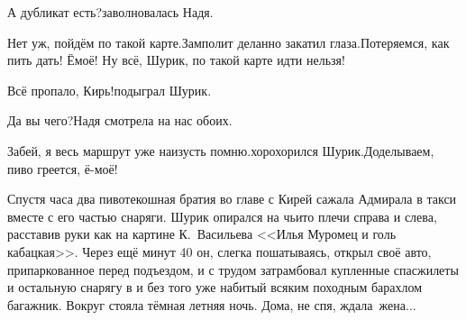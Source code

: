 \diagdash А дубликат есть?\mdash заволновалась Надя.

\diagdash Нет уж, пойдём по такой карте.\mdash Замполит деланно закатил глаза.\mdash Потеряемся, как пить дать! Ё\sdash моё! Ну всё, Шурик, по такой карте идти нельзя! 

\diagdash Всё пропало, Кирь!\mdash подыграл Шурик.

\diagdash Да вы чего?\mdash Надя смотрела на нас обоих.

\diagdash Забей, я весь маршрут уже наизусть помню.\mdash хорохорился Шурик.\mdash Доделываем, пиво греется, ё-моё!

Спустя часа два пивотекошная братия во главе с Кирей сажала Адмирала в такси вместе с его частью снаряги. Шурик опирался на чьи\sdash то плечи справа и слева, расставив руки как на картине К.~Васильева <<Илья Муромец и голь кабацкая>>. Через ещё минут 40 он, слегка пошатываясь, открыл своё авто, припаркованное перед подъездом, и с трудом затрамбовал купленные спасжилеты и остальную снарягу в и без того уже набитый всяким походным барахлом багажник. Вокруг стояла тёмная летняя ночь. Дома, не спя, ждала~жена$\ldots$

\begin{center}
\end{center}
